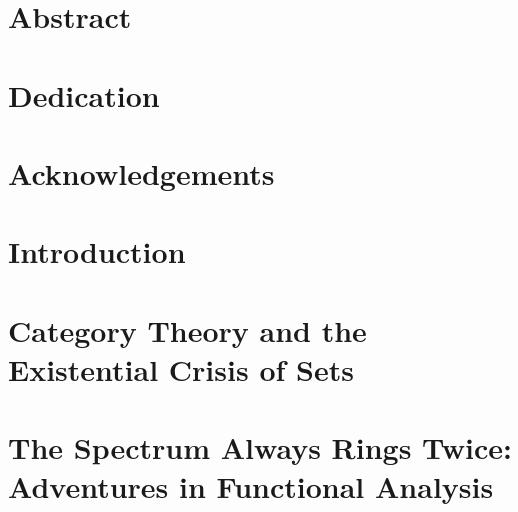 \documentclass[a4paper,11pt,twoside,openright]{book}
\begin{document}
    
    \thispagestyle{empty}
    \clearpage

    \frontmatter

    
    \thispagestyle{empty}

    \chapter*{Abstract}
    

    \chapter*{Dedication}
    

    \chapter*{Acknowledgements}
    

    \tableofcontents

    \printnoidxglossary[type=symbols,style=long,title={List of Symbols}]
    \thispagestyle{empty}

    \mainmatter


    \chapter{Introduction}
    \label{chap:intro}
    

    \chapter{Category Theory and the Existential Crisis of Sets}
    \label{chap:category_crisis}
    

    \chapter{The Spectrum Always Rings Twice: Adventures in Functional Analysis}
    \label{chap:spectrum_fun}
    

    \backmatter

    \nocite{*}
    \printbibliography[
        heading=bibintoc,
        title={Bibliography}]

    \printindex
\end{document}
